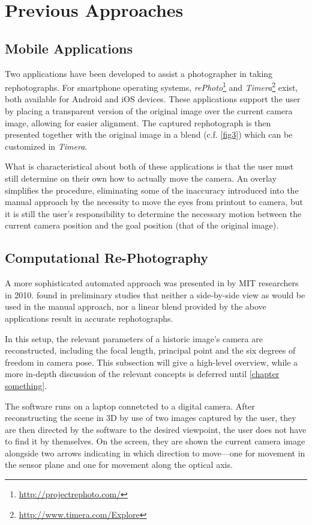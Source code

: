 \section{Previous Approaches}

\subsection{Mobile Applications}

Two applications have been developed to assist a photographer in taking
rephotographs. For smartphone operating systems,
\emph{rePhoto}\footnote{\url{http://projectrephoto.com/}} and
\emph{Timera}\footnote{\url{http://www.timera.com/Explore}} exist, both
available for Android and iOS devices. These applications support the user by placing a transparent
version of the original image over the current camera image, allowing for easier
alignment. The captured rephotograph is then presented together with the
original image in a blend (c.f. \autoref{fig3}) which can be customized in
\emph{Timera}.

What is characteristical about both of these applications is that the user must still
determine on their own how to actually move the camera. An overlay simplifies
the procedure, eliminating some of the inaccuracy introduced into the manual approach by the
necessity to move the eyes from printout to camera, but it is still the user's
responsibility to determine the necessary motion between the current camera
position and the goal position (that of the original image). 

\subsection{Computational Re-Photography}

A more
sophisticated automated approach was presented in by MIT researchers in
2010. \citet{bae2010} found in preliminary studies that neither a side-by-side
view as would be used in the manual approach, nor a linear blend provided by
the above applications result in accurate rephotographs.

In this setup, the relevant parameters of a historic image's camera are
reconstructed, including the focal length, principal point and the six degrees
of freedom in camera pose. This subsection will give a high-level overview,
while a more in-depth discussion of the relevant concepts is deferred until
\autoref{chapter something}.

The software runs on a laptop connetcted to a digital camera.  After
reconstructing the scene in 3D by use of two images captured by the user, they
are then directed by the software to the desired viewpoint, the user does not
have to find it by themselves.  On the screen, they
are shown the current camera image alongside two arrows indicating in which
direction to move---one for movement in the sensor plane and one for movement
along the optical axis.

